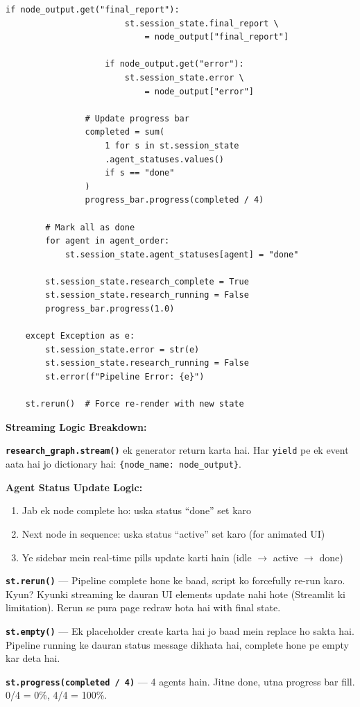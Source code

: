 \documentclass[12pt, a4paper]{article}
\begin{document}
\begin{lstlisting}[style=pythonstyle, title={\color{accentgreen}\faIcon{file} app.py --- Research Pipeline Execution}]
                    if node_output.get("final_report"):
                        st.session_state.final_report \
                            = node_output["final_report"]

                    if node_output.get("error"):
                        st.session_state.error \
                            = node_output["error"]

                # Update progress bar
                completed = sum(
                    1 for s in st.session_state
                    .agent_statuses.values()
                    if s == "done"
                )
                progress_bar.progress(completed / 4)

        # Mark all as done
        for agent in agent_order:
            st.session_state.agent_statuses[agent] = "done"

        st.session_state.research_complete = True
        st.session_state.research_running = False
        progress_bar.progress(1.0)

    except Exception as e:
        st.session_state.error = str(e)
        st.session_state.research_running = False
        st.error(f"Pipeline Error: {e}")

    st.rerun()  # Force re-render with new state
\end{lstlisting}

\begin{codestorybox}
\textbf{Streaming Logic Breakdown:}

\textbf{\texttt{research\_graph.stream()}} ek generator return karta hai. Har \texttt{yield} pe ek event aata hai jo dictionary hai: \texttt{\{node\_name: node\_output\}}.

\textbf{Agent Status Update Logic:}
\begin{enumerate}
\item Jab ek node complete ho: uska status ``done'' set karo
\item Next node in sequence: uska status ``active'' set karo (for animated UI)
\item Ye sidebar mein real-time pills update karti hain (idle $\rightarrow$ active $\rightarrow$ done)
\end{enumerate}

\textbf{\texttt{st.rerun()}} --- Pipeline complete hone ke baad, script ko forcefully re-run karo. Kyun? Kyunki streaming ke dauran UI elements update nahi hote (Streamlit ki limitation). Rerun se pura page redraw hota hai with final state.

\textbf{\texttt{st.empty()}} --- Ek placeholder create karta hai jo baad mein replace ho sakta hai. Pipeline running ke dauran status message dikhata hai, complete hone pe empty kar deta hai.

\textbf{\texttt{st.progress(completed / 4)}} --- 4 agents hain. Jitne done, utna progress bar fill. 0/4 = 0\%, 4/4 = 100\%.
\end{codestorybox}
\end{document}
